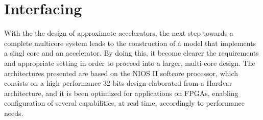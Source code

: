 \chapter{Interfacing}
\label{ch:interfaces}

With the the design of approximate accelerators, the next step towards a complete
multicore system leads to the construction of a model that implements a singl
core and an accelerator. By doing this, it become clearer the requirements and
appropriate setting in order to proceed into a larger, multi-core design.
The architectures presented are based on the NIOS II softcore processor, which
consists on a high performance 32 bits design elaborated from a Hardvar
architecture, and it is been optimized for applications on FPGAs, enabling
configuration of several capabilities, at real time, accordingly to performance
needs.